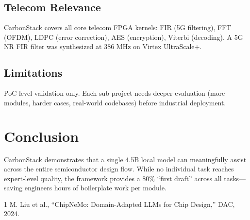 \documentclass[conference]{IEEEtran}
\begin{document}
\subsection{Telecom Relevance}
CarbonStack covers all core telecom FPGA kernels: FIR (5G filtering),
FFT (OFDM), LDPC (error correction), AES (encryption), Viterbi
(decoding). A 5G NR FIR filter was synthesized at 386 MHz on
Virtex UltraScale+.

\subsection{Limitations}
PoC-level validation only. Each sub-project needs deeper evaluation
(more modules, harder cases, real-world codebases) before industrial
deployment.

\section{Conclusion}

CarbonStack demonstrates that a single 4.5B local model can
meaningfully assist across the entire semiconductor design flow.
While no individual task reaches expert-level quality, the framework
provides a 80\% ``first draft'' across all tasks---saving engineers
hours of boilerplate work per module.


\begin{thebibliography}{1}
 M. Liu et al., ``ChipNeMo: Domain-Adapted LLMs for Chip Design,'' DAC, 2024.
\end{thebibliography}
\end{document}
